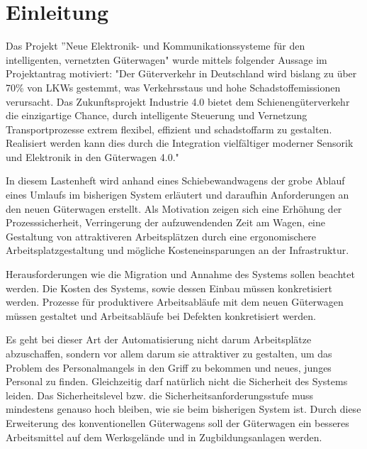 \section{Einleitung}
Das Projekt ”Neue Elektronik- und Kommunikationssysteme für den intelligenten, vernetzten Güterwagen" wurde mittels folgender Aussage im Projektantrag motiviert: "Der Güterverkehr in Deutschland wird bislang zu über 70\% von LKWs gestemmt, was Verkehrsstaus und hohe Schadstoffemissionen verursacht. Das Zukunftsprojekt Industrie 4.0 bietet dem Schienengüterverkehr die einzigartige Chance, durch intelligente Steuerung und Vernetzung Transportprozesse extrem flexibel, effizient und schadstoffarm zu gestalten. Realisiert werden kann dies durch die Integration vielfältiger moderner Sensorik und Elektronik in den Güterwagen 4.0." \cite{AZAP} \par
In diesem Lastenheft wird anhand eines Schiebewandwagens der grobe Ablauf eines Umlaufs im bisherigen System erläutert und daraufhin Anforderungen an den neuen Güterwagen erstellt. Als Motivation zeigen sich eine Erhöhung der Prozesssicherheit, Verringerung der aufzuwendenden Zeit am Wagen, eine Gestaltung von attraktiveren Arbeitsplätzen durch eine ergonomischere Arbeitsplatzgestaltung und mögliche Kosteneinsparungen an der Infrastruktur.\par
Herausforderungen wie die Migration und Annahme des Systems sollen beachtet werden. Die Kosten des Systems, sowie dessen Einbau müssen konkretisiert werden. Prozesse für produktivere Arbeitsabläufe mit dem neuen Güterwagen müssen gestaltet und Arbeitsabläufe bei Defekten konkretisiert werden.\par
Es geht bei dieser Art der Automatisierung nicht darum Arbeitsplätze abzuschaffen, sondern vor allem darum sie attraktiver zu gestalten, um das Problem des Personalmangels in den Griff zu bekommen und neues, junges Personal zu finden. Gleichzeitig darf natürlich nicht die Sicherheit des Systems leiden. Das Sicherheitslevel bzw. die Sicherheitsanforderungsstufe muss mindestens genauso hoch bleiben, wie sie beim bisherigen System ist. Durch diese Erweiterung des konventionellen Güterwagens soll der Güterwagen ein besseres Arbeitsmittel auf dem Werksgelände und in Zugbildungsanlagen werden.\par

